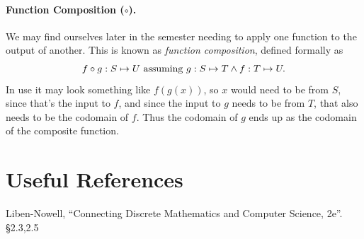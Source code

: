 \paragraph{Function Composition ($\circ$).}
We may find ourselves later in the semester needing to apply one function to the output of another.
This is known as \emph{function composition}, defined formally as
\[
f\circ g: S \mapsto U \textnormal{ assuming } g: S \mapsto T \wedge f : T \mapsto U.
\]
In use it may look something like $f\left(g\left(x\right)\right)$, 
so $x$ would need to be from $S$, since that's the input to $f$, and since the input to $g$ needs to be from $T$, 
that also needs to be the codomain of $f$. Thus the codomain of $g$ ends up as the codomain of the composite function. 

\section*{Useful References}
Liben-Nowell, ``Connecting Discrete Mathematics and Computer Science, 2e''. \S 2.3,2.5

  